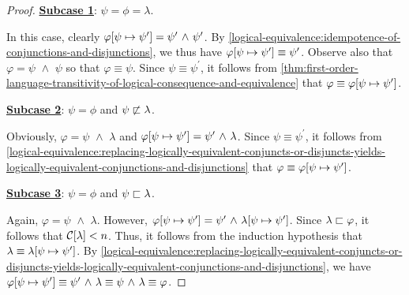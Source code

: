 \begin{proof}
    \vspace{0.3cm}
    \noindent
    \underline{\textbf{Subcase 1}}: \( \psi = \phi = \lambda \).

    \vspace{0.1cm}
    \noindent
    In this case, clearly \( \folsubformulasubstitution{\varphi}{\psi}{\psi^{\prime}}
    = \psi^{\prime} \,\,{\land}\,\, \psi^{\prime} \).
    By \cref{logical-equivalence:idempotence-of-conjunctions-and-disjunctions}, we thus have
    \( \folsubformulasubstitution{\varphi}{\psi}{\psi^{\prime}} \equiv \psi^{\prime}\).
    Observe also that \( \varphi = \psi \,\,{\land}\,\, \psi \) so that \( \varphi \equiv \psi \).
    Since \( \psi \equiv \psi^{\prime} \), it follows from \cref{thm:first-order-language-transitivity-of-logical-consequence-and-equivalence}
    that \( \varphi \equiv \folsubformulasubstitution{\varphi}{\psi}{\psi^{\prime}} \).

    \vspace{0.3cm}
    \noindent
    \underline{\textbf{Subcase 2}}: \( \psi = \phi \) and \( \psi  \not\sqsubset {\lambda} \).

    \vspace{0.1cm}
    \noindent
    Obviously, \( \varphi = \psi \,\,{\land}\,\, \lambda \) and \( \folsubformulasubstitution{\varphi}{\psi}{\psi^{\prime}} = \psi^{\prime} \,\,{\land}\,\, \lambda \).
    Since \( \psi \equiv \psi^{\prime} \), it follows from
    \cref{logical-equivalence:replacing-logically-equivalent-conjuncts-or-disjuncts-yields-logically-equivalent-conjunctions-and-disjunctions}
    that \( \varphi \equiv \folsubformulasubstitution{\varphi}{\psi}{\psi^{\prime}} \).

    \vspace{0.3cm}
    \noindent
    \underline{\textbf{Subcase 3}}: \( \psi = \phi \) and \( \psi  \sqsubset {\lambda} \).

    \vspace{0.1cm}
    \noindent
    Again, \( \varphi = \psi \,\,{\land}\,\, \lambda \).
    However, \( \folsubformulasubstitution{\varphi}{\psi}{\psi^{\prime}} = \psi^{\prime} \,\,{\land}\,\, \folsubformulasubstitution{\lambda}{\psi}{\psi^{\prime}} \).
    Since \( \lambda  \sqsubset  \varphi \), it follows that \( \folcomplexityofformula{\lambda} < n \).
    Thus, it follows from the induction hypothesis that \( \lambda \equiv \folsubformulasubstitution{\lambda}{\psi}{\psi^{\prime}} \).
    By \cref{logical-equivalence:replacing-logically-equivalent-conjuncts-or-disjuncts-yields-logically-equivalent-conjunctions-and-disjunctions},
    we have \( \folsubformulasubstitution{\varphi}{\psi}{\psi^{\prime}} \equiv \psi^{\prime} \,\,{\land}\,\, \lambda \equiv \psi \,\,{\land}\,\, \lambda
    \equiv \varphi \).


\end{proof}
